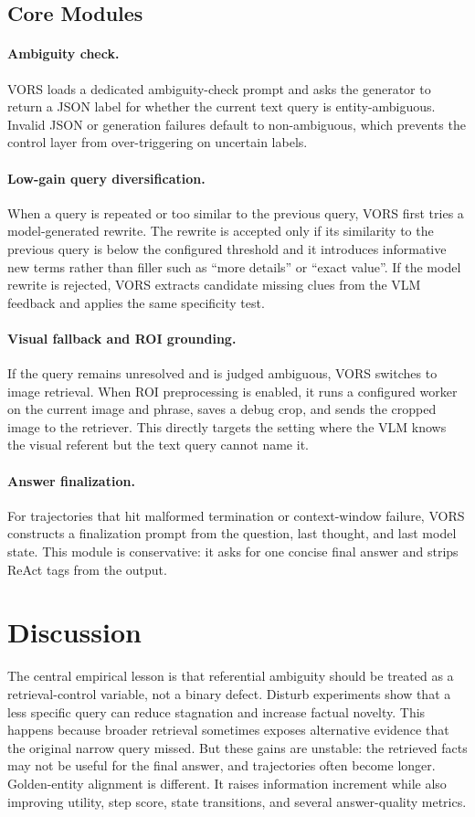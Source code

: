 \documentclass{article}
\begin{document}
\subsection{Core Modules}
\paragraph{Ambiguity check.}
VORS loads a dedicated ambiguity-check prompt and asks the generator to return a JSON label for whether the current text query is entity-ambiguous.
Invalid JSON or generation failures default to non-ambiguous, which prevents the control layer from over-triggering on uncertain labels.

\paragraph{Low-gain query diversification.}
When a query is repeated or too similar to the previous query, VORS first tries a model-generated rewrite.
The rewrite is accepted only if its similarity to the previous query is below the configured threshold and it introduces informative new terms rather than filler such as ``more details'' or ``exact value''.
If the model rewrite is rejected, VORS extracts candidate missing clues from the VLM feedback and applies the same specificity test.

\paragraph{Visual fallback and ROI grounding.}
If the query remains unresolved and is judged ambiguous, VORS switches to image retrieval.
When ROI preprocessing is enabled, it runs a configured worker on the current image and phrase, saves a debug crop, and sends the cropped image to the retriever.
This directly targets the setting where the VLM knows the visual referent but the text query cannot name it.

\paragraph{Answer finalization.}
For trajectories that hit malformed termination or context-window failure, VORS constructs a finalization prompt from the question, last thought, and last model state.
This module is conservative: it asks for one concise final answer and strips ReAct tags from the output.

\section{Discussion}
The central empirical lesson is that referential ambiguity should be treated as a retrieval-control variable, not a binary defect.
Disturb experiments show that a less specific query can reduce stagnation and increase factual novelty.
This happens because broader retrieval sometimes exposes alternative evidence that the original narrow query missed.
But these gains are unstable: the retrieved facts may not be useful for the final answer, and trajectories often become longer.
Golden-entity alignment is different.
It raises information increment while also improving utility, step score, state transitions, and several answer-quality metrics.
\end{document}
